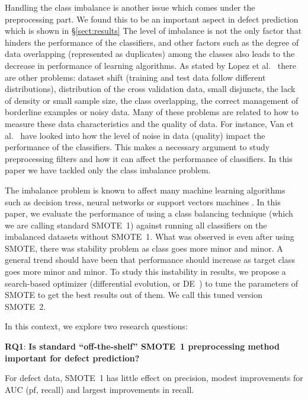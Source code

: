 \documentclass[sigconf,review, anonymous]{acmart}
\theoremstyle{break}
\newcommand{\tion}[1]{{\S}\ref{sect:#1}}
\begin{document}
Handling the class imbalance is another issue which comes 
under the preprocessing part. We found this to be an important aspect in defect prediction which is shown in \tion{results} The level of imbalance is not the only factor that hinders
the performance of the classifiers, and other factors
such as the degree of data overlapping (represented
as duplicates) among the classes also leads to the decrease in performance of
learning algorithms. As stated by Lopez et al.~\cite{lopez2014importance,lopez2012analysis} there
are other problems: dataset shift (training and test
data follow different distributions), distribution of the
cross validation data, small disjuncts, the lack of density
or small sample size, the class overlapping, the
correct management of borderline examples or noisy
data. Many of these problems are related to how to
measure these data characteristics and the quality of
data. For instance, Van et al.~\cite{van2009knowledge}
have looked into how the level of noise in data (quality) impact the performance of the classifiers. This makes a necessary argument to study preprocessing filters and how it can affect the performance of classifiers. In this paper we have tackled only the class imbalance problem.

The imbalance problem is known to affect
many machine learning algorithms such as decision tress,
neural networks or support vectors machines \cite{japkowicz2002class}. In this paper, we evaluate the performance of using a class balancing technique (which we are calling standard SMOTE~1\cite{chawla2002smote}) against running all classifiers on the imbalanced datasets without SMOTE~1. What was observed is even after using SMOTE, there was stability problem as class goes more minor and minor. A general trend should have been that performance should increase as target class goes more minor and minor. To study this instability in results, we propose a search-based optimizer (differential evolution, or DE~\cite{storn1997differential}) to tune the parameters of SMOTE to get the best results out of them.
We call this tuned version SMOTE~2.

In this context, we explore two research questions:  
 
  \textbf{RQ1}: \textbf{Is standard ``off-the-shelf'' SMOTE~1 preprocessing method important for defect prediction?} 

 \begin{lesson}For defect data, SMOTE~1 has little effect on 
 precision, modest improvements for AUC (pf, recall) and largest improvements in recall.
 \end{lesson}
\end{document}
